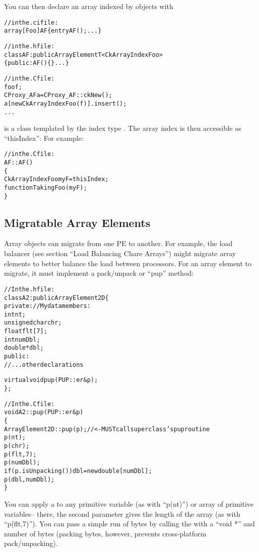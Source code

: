 You can then declare an array indexed by  objects with

\begin{alltt}
//in the .ci file:
array [Foo] AF \{ entry AF(); ... \}

//in the .h file:
class AF:public ArrayElementT<CkArrayIndexFoo>
\{ public: AF() \{\} ... \}

//in the .C file:
    foo f;
    CProxy_AF a=CProxy_AF::ckNew();
    a[new CkArrayIndexFoo(f)].insert();
    ...
\end{alltt}

 is a class templated by the index type .
The array index is then accessible as ``thisIndex'':
For example:

\begin{alltt}

//in the .C file:
AF::AF()
\{
    CkArrayIndexFoo myF=thisIndex;
    functionTakingFoo(myF);
\}
\end{alltt}


\subsection{Migratable Array Elements}
Array objects can migrate from one PE to another.
For example, the load balancer (see section ``Load Balancing Chare Arrays'')
might migrate array elements to better balance the load between
processors.  For an array element to migrate, it must implement
a pack/unpack or ``pup'' method:

\begin{alltt}
//In the .h file:
class A2:public ArrayElement2D \{
private: //My data members:
    int nt;
    unsigned char chr;
    float flt[7];
    int numDbl;
    double *dbl;
public:	
    //...other declarations

    virtual void pup(PUP::er \&p);
\};

//In the .C file:
void A2::pup(PUP::er \&p)
\{
    ArrayElement2D::pup(p); //<- MUST call superclass's pup routine
    p(nt);
    p(chr);
    p(flt,7);
    p(numDbl);
    if (p.isUnpacking()) dbl=new double[numDbl];
    p(dbl,numDbl);
\}
\end{alltt}

You can apply a  to any primitive variable
(as with ``p(nt)'') or array of primitive variables-- there,
the second parameter gives the length of the array (as with
``p(flt,7)'').  You can pass a simple run of bytes 
by calling the  with a ``void *'' and number of bytes
(packing bytes, however, prevents cross-platform pack/unpacking).

